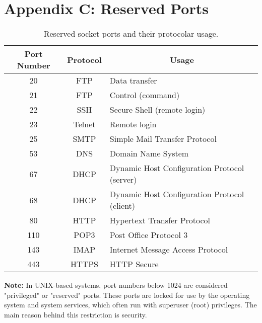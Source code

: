 \renewcommand{\thefigure}{C\arabic{figure}}
\renewcommand{\thetable}{C\arabic{table}}
\setcounter{figure}{0}
\setcounter{table}{0}

\clearpage
\section{Appendix C: Reserved Ports}
\label{appendixC}
{
\setlength{\tabcolsep}{16pt}

\begin{table}[h!]
    \centering
    \captionsetup{justification=centering}
    \begin{tabularx}{\textwidth}{ccl}
        \toprule
        \textbf{Port Number} & \textbf{Protocol} & \multicolumn{1}{c}{\textbf{Usage}} \\
        \midrule
        20 & FTP & Data transfer \\ 
        21 & FTP & Control (command) \\
        22 & SSH & Secure Shell (remote login) \\
        23 & Telnet & Remote login \\
        25 & SMTP & Simple Mail Transfer Protocol \\
        53 & DNS & Domain Name System \\
        67 & DHCP & Dynamic Host Configuration Protocol (server) \\
        68 & DHCP & Dynamic Host Configuration Protocol (client) \\
        80 & HTTP & Hypertext Transfer Protocol \\
        110 & POP3 & Post Office Protocol 3 \\
        143 & IMAP & Internet Message Access Protocol \\
        443 & HTTPS & HTTP Secure \\
        \bottomrule
    \end{tabularx}
    \caption{Reserved socket ports and their protocolar usage.}
    \label{tab:reserved_ports}
\end{table}
}

\noindent \textbf{Note:} In UNIX-based systems, port numbers below 1024 are considered "privileged" or "reserved" ports. These ports are locked for use by the operating system and system services, which often run with superuser (root) privileges. The main reason behind this restriction is security.

